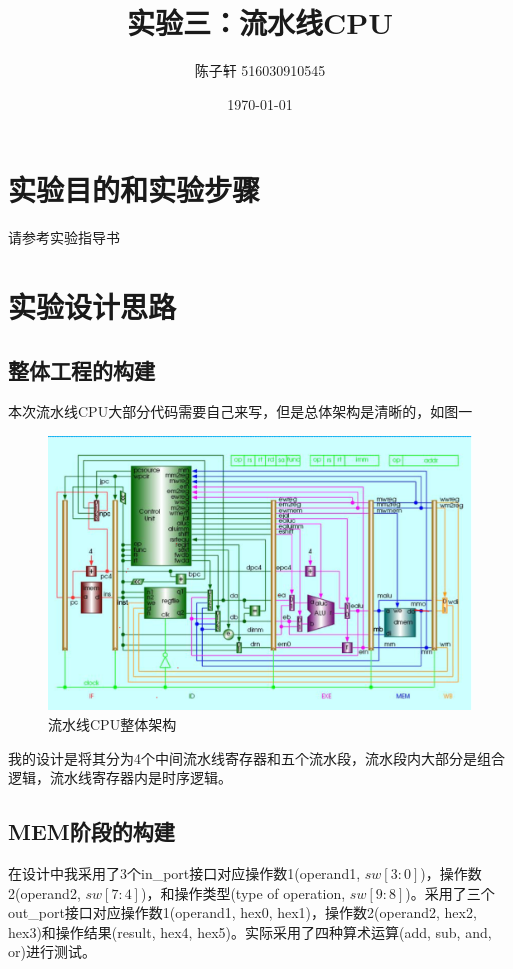 \documentclass[UTF8]{ctexart}
\title{实验三：流水线CPU}
\author{陈子轩 516030910545}
\date{\today}
\begin{document}
\maketitle
\section{实验目的和实验步骤}
请参考实验指导书
\section{实验设计思路}
\subsection{整体工程的构建}
本次流水线CPU大部分代码需要自己来写，但是总体架构是清晰的，如图一
\begin{figure}
    \centering
    \includegraphics[width=1\textwidth]{pipelinecpu.png}
    \caption{流水线CPU整体架构}
\end{figure}
我的设计是将其分为4个中间流水线寄存器和五个流水段，流水段内大部分是组合逻辑，流水线寄存器内是时序逻辑。
\subsection{MEM阶段的构建}
在设计中我采用了3个in\_port接口对应操作数1(operand1, $sw[3:0]$)，操作数2(operand2, $sw[7:4]$)，和操作类型(type of operation, $sw[9:8]$)。采用了三个out\_port接口对应操作数1(operand1, hex0, hex1)，操作数2(operand2, hex2, hex3)和操作结果(result, hex4, hex5)。实际采用了四种算术运算(add, sub, and, or)进行测试。
\end{document}
